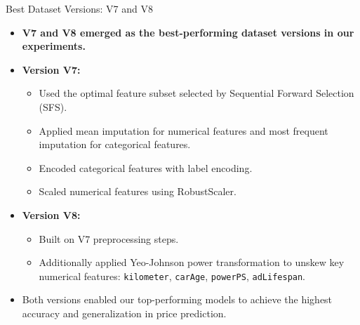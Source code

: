 \documentclass{beamer}
\begin{document}
\begin{frame}{Best Dataset Versions: V7 and V8}
        \begin{itemize}
                \item \textbf{V7 and V8 emerged as the best-performing dataset
                        versions in our experiments.}
                \item \textbf{Version V7:}
                        \begin{itemize}
                                \item Used the optimal feature subset selected
                                        by Sequential Forward Selection (SFS).
                                \item Applied mean imputation for numerical
                                        features and most frequent imputation
                                        for categorical features.
                                \item Encoded categorical features with label
                                        encoding.
                                \item Scaled numerical features using
                                        RobustScaler.
                        \end{itemize}
                \item \textbf{Version V8:}
                        \begin{itemize}
                                \item Built on V7 preprocessing steps.
                                \item Additionally applied Yeo-Johnson power
                                        transformation to unskew key numerical
                                        features: \texttt{kilometer},
                                        \texttt{carAge}, \texttt{powerPS},
                                        \texttt{adLifespan}.
                        \end{itemize}
                \item Both versions enabled our top-performing models to
                        achieve the highest accuracy and generalization in
                        price prediction.
        \end{itemize}
\end{frame}
\end{document}
